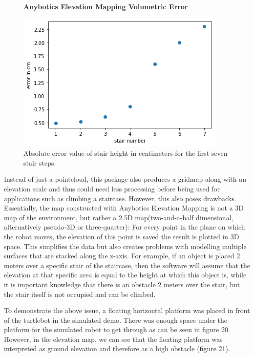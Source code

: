 \documentclass{article}
\begin{document}
\begin{figure}[h] %
    \centering
    \textbf{Anybotics Elevation Mapping Volumetric Error}\par\medskip
	\includegraphics[width=\textwidth,height=\textheight,keepaspectratio]{report1-img018.png} %
	\caption{Absolute error value of stair height in centimeters for the first seven stair steps. }
\end{figure}

Instead of just a pointcloud, this package also produces a gridmap along with an elevation scale and thus could need less processing before being used for applications such as climbing a staircase. However, this also poses drawbacks. Essentially, the map constructed with Anybotics Elevation Mapping is not a 3D map of the environment, but rather a 2.5D map(two-and-a-half dimensional, alternatively pseudo-3D or three-quarter): For every point in the plane on which the robot moves, the elevation of this point is saved the result is plotted in 3D space. This simplifies the data but also creates problems with modelling multiple surfaces that are stacked along the z-axis. For example, if an object is placed 2 meters over a specific stair of the staircase, then the software will assume that the elevation at that specific area is equal to the height at which this object is, while it is important knowledge that there is an obstacle 2 meters over the stair, but the stair itself is not occupied and can be climbed.

To demonstrate the above issue, a floating horizontal platform was placed in front of the turtlebot in the simulated demo. There was enough space under the platform for the simulated robot to get through as can be seen in figure 20. However, in the elevation map, we can see that the floating platform was interpreted as ground elevation and therefore as a high obstacle (figure 21).
\end{document}
